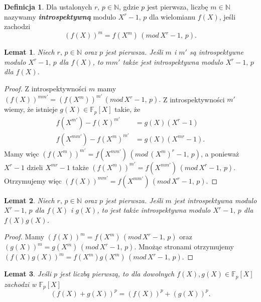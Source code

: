 \documentclass[declaration,shortabstract]{iithesis}
\theoremstyle{definition}
\newtheorem{definition}{Definicja}
\theoremstyle{remark} \newtheorem{observation}{Obserwacja}
\theoremstyle{plain} \newtheorem{theorem}{Twierdzenie}
\theoremstyle{plain} \newtheorem{lemma}{Lemat}
\theoremstyle{remark} \newtheorem*{remark*}{Uwaga}
\theoremstyle{reminder} \newtheorem*{reminder*}{Przypomnienie}
\begin{document}
\begin{definition}
	Dla ustalonych $r, \, p \in \mathbb{N}$, gdzie $p$ jest pierwsza, liczbę $m \in \mathbb{N}$ nazywamy \textbf{\textit{introspektywną}} modulo $X^r - 1, \, p$ dla wielomianu $f(X)$, jeśli zachodzi \[(f(X))^m = f(X^m) \, (mod \, X^r - 1, \, p).\]
\end{definition}
	
\begin{lemma}\label{intro1}
	Niech $r, \, p \in \mathbb{N}$ oraz $p$ jest pierwsza. Jeśli $m$ i $m'$ są introspektywne modulo $X^r - 1, \, p$ dla $f(X)$, to $mm'$ także jest introspektywna modulo $X^r - 1, \, p$ dla $f(X)$.
\end{lemma}
	
\begin{proof}
	Z introspektywności $m$ mamy $(f(X))^{mm'} = (f(X^m))^{m'} \, (mod \, X^r - 1, \, p).$ Z introspektywności $m'$ wiemy, że istnieje $g(X) \in \mathbb{F}_p[X]$ takie, że 
	\begin{align*}
		f(X^{m'}) - {f(X)}^{m'}    & = g(X)(X^r - 1)     \\
		f(X^{mm'}) - {f(X^m)}^{m'} & = g(X)(X^{mr} - 1). 
	\end{align*}
	Mamy więc $(f(X^m))^{m'} = f(X^{mm'}) \, (mod \, (X^m)^r - 1, \, p)$, a ponieważ $X^r - 1$ dzieli $X^{mr} - 1$ także $(f(X^m))^{m'} = f(X^{mm'}) \, (mod \, X^r - 1, \, p)$. Otrzymujemy więc $(f(X))^{mm'} = f(X^{mm'}) \, (mod \, X^r - 1, \, p)$.
\end{proof}
	
\begin{lemma}\label{intro2}
	Niech $r, \, p \in \mathbb{N}$ oraz $p$ jest pierwsza. Jeśli $m$ jest introspektywna modulo $X^r - 1, \, p$ dla $f(X)$ i $g(X)$, to jest także introspektywna modulo $X^r - 1, \, p$ dla $f(X)g(X)$.
\end{lemma}
	
\begin{proof}
	Mamy $(f(X))^m = f(X^m) \, (mod \, X^r - 1, \, p)$ oraz $(g(X))^m = g(X^m) \, (mod \, X^r - 1, \, p)$. Mnożąc stronami otrzymujemy $(f(X)g(X))^m = f(X^m)g(X^m) \, (mod \, X^r - 1, \, p)$.
\end{proof}

\begin{lemma}\label{p_intro}
	Jeśli $p$ jest liczbą pierwszą, to dla dowolnych $f(X), g(X) \in \mathbb{F}_p[X]$ zachodzi w $\mathbb{F}_p[X]$ \[(f(X) + g(X))^p = (f(X))^p + (g(X))^p.\]
\end{lemma}
	
\end{document}
